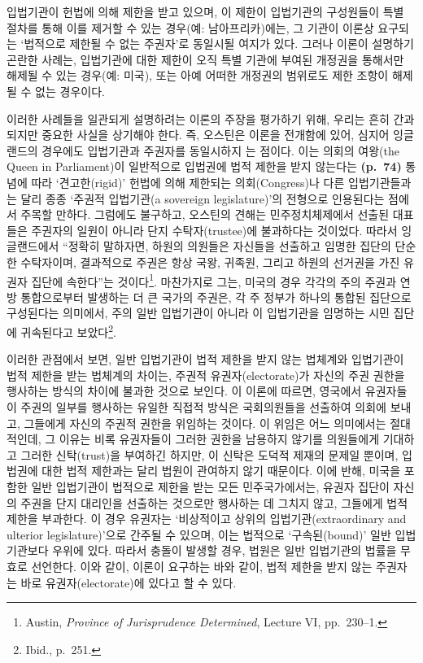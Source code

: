 입법기관이 헌법에 의해 제한을 받고 있으며, 이 제한이 입법기관의
구성원들이 특별 절차를 통해 이를 제거할 수 있는 경우(예:
남아프리카)에는, 그 기관이 이론상 요구되는 `법적으로 제한될 수 없는
주권자'로 동일시될 여지가 있다. 그러나 이론이 설명하기 곤란한 사례는,
입법기관에 대한 제한이 오직 특별 기관에 부여된 개정권을 통해서만 해제될
수 있는 경우(예: 미국), 또는 아예 어떠한 개정권의 범위로도 제한 조항이
해제될 수 없는 경우이다.

이러한 사례들을 일관되게 설명하려는 이론의 주장을 평가하기 위해, 우리는
흔히 간과되지만 중요한 사실을 상기해야 한다. 즉, 오스틴은 이론을
전개함에 있어, 심지어 잉글랜드의 경우에도 입법기관과 주권자를 동일시하지
는 점이다. 이는 의회의 여왕(the Queen in Parliament)이
일반적으로 입법권에 법적 제한을 받지 않는다는 \textbf{(p.~74)} 통념에
따라 `견고한(rigid)' 헌법에 의해 제한되는 의회(Congress)나 다른
입법기관들과는 달리 종종 `주권적 입법기관(a sovereign legislature)'의
전형으로 인용된다는 점에서 주목할 만하다. 그럼에도 불구하고, 오스틴의
견해는 민주정치체제에서 선출된 대표들은 주권자의 일원이 아니라 단지
수탁자(trustee)에 불과하다는 것이었다. 따라서 잉글랜드에서 ``정확히
말하자면, 하원의 의원들은 자신들을 선출하고 임명한 집단의 단순한
수탁자이며, 결과적으로 주권은 항상 국왕, 귀족원, 그리고 하원의 선거권을
가진 유권자 집단에 속한다''는 것이다\footnote{Austin, \emph{Province of
  Jurisprudence Determined}, Lecture VI, pp.~230--1.}. 마찬가지로 그는,
미국의 경우 각각의 주의 주권과 연방 통합으로부터 발생하는 더 큰 국가의
주권은, 각 주 정부가 하나의 통합된 집단으로 구성된다는 의미에서, 주의
일반 입법기관이 아니라 이 입법기관을 임명하는 시민 집단에 귀속된다고
보았다\footnote{Ibid., p.~251.}.

이러한 관점에서 보면, 일반 입법기관이 법적 제한을 받지 않는 법체계와
입법기관이 법적 제한을 받는 법체계의 차이는, 주권적 유권자(electorate)가
자신의 주권 권한을 행사하는 방식의 차이에 불과한 것으로 보인다. 이
이론에 따르면, 영국에서 유권자들이 주권의 일부를 행사하는 유일한 직접적
방식은 국회의원들을 선출하여 의회에 보내고, 그들에게 자신의 주권적
권한을 위임하는 것이다. 이 위임은 어느 의미에서는 절대적인데, 그 이유는
비록 유권자들이 그러한 권한을 남용하지 않기를 의원들에게 기대하고 그러한
신탁(trust)을 부여하긴 하지만, 이 신탁은 도덕적 제재의 문제일 뿐이며,
입법권에 대한 법적 제한과는 달리 법원이 관여하지 않기 때문이다. 이에
반해, 미국을 포함한 일반 입법기관이 법적으로 제한을 받는 모든
민주국가에서는, 유권자 집단이 자신의 주권을 단지 대리인을 선출하는
것으로만 행사하는 데 그치지 않고, 그들에게 법적 제한을 부과한다. 이 경우
유권자는 `비상적이고 상위의 입법기관(extraordinary and ulterior
legislature)'으로 간주될 수 있으며, 이는 법적으로 `구속된(bound)' 일반
입법기관보다 우위에 있다. 따라서 충돌이 발생할 경우, 법원은 일반
입법기관의 법률을 무효로 선언한다. 이와 같이, 이론이 요구하는 바와 같이,
법적 제한을 받지 않는 주권자는 바로 유권자(electorate)에 있다고 할 수
있다.

